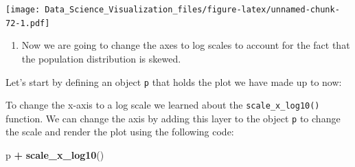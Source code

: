 \documentclass[
]{article}
\newenvironment{Shaded}{\begin{snugshade}}{\end{snugshade}}
\newcommand{\CommentTok}[1]{\textcolor[rgb]{0.56,0.35,0.01}{\textit{#1}}}
\newcommand{\DataTypeTok}[1]{\textcolor[rgb]{0.13,0.29,0.53}{#1}}
\newcommand{\KeywordTok}[1]{\textcolor[rgb]{0.13,0.29,0.53}{\textbf{#1}}}
\newcommand{\NormalTok}[1]{#1}
\newcommand{\OperatorTok}[1]{\textcolor[rgb]{0.81,0.36,0.00}{\textbf{#1}}}
\newcommand{\StringTok}[1]{\textcolor[rgb]{0.31,0.60,0.02}{#1}}
\providecommand{\tightlist}{%
  \setlength{\itemsep}{0pt}\setlength{\parskip}{0pt}}
\begin{document}
\texttt{[image: Data\_Science\_Visualization\_files/figure-latex/unnamed-chunk-72-1.pdf]}

\begin{enumerate}
\def\labelenumi{\arabic{enumi}.}
\setcounter{enumi}{12}
\tightlist
\item
  Now we are going to change the axes to log scales to account for the
  fact that the population distribution is skewed.
\end{enumerate}

Let's start by defining an object \texttt{p} that holds the plot we have
made up to now:

\begin{Shaded}
\end{Shaded}

To change the x-axis to a log scale we learned about the
\texttt{scale\_x\_log10()} function. We can change the axis by adding
this layer to the object \texttt{p} to change the scale and render the
plot using the following code:

\begin{Shaded}
\begin{Highlighting}[]
\NormalTok{p }\OperatorTok{+}\StringTok{ }\KeywordTok{scale_x_log10}\NormalTok{()}
\end{Highlighting}
\end{Shaded}

\begin{Shaded}
\end{Shaded}
\end{document}
